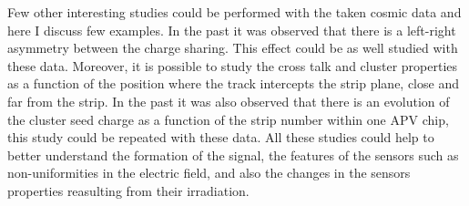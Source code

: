 Few other interesting studies could be performed with the taken cosmic data and here I discuss few examples. In the past it was observed that there is a left-right asymmetry between the charge sharing. This effect could be as well studied with these data. Moreover, it is possible to study the cross talk and cluster properties as a function of the position where the track intercepts the strip plane, close and far from the strip. In the past it was also observed that there is an evolution of the cluster seed charge as a function of the strip number within one APV chip, this study could be repeated with these data. All these studies could help to better understand the formation of the signal, the features of the sensors such as non-uniformities in the electric field, and also the changes in the sensors properties reasulting from their irradiation. 



 



